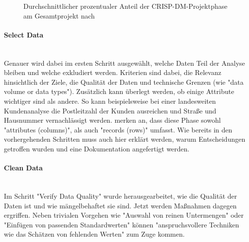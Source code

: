 \begin{figure}[H]
\caption{Durchschnittlicher prozentualer Anteil der CRISP-DM-Projektphase am Gesamtprojekt nach \citep[S.~15; eigene Darstellung]{shearer_crisp-dm_2000}}
\label{fig:CRISP_DM_percent}
\centering
\end{figure}

\paragraph{Select Data}\mbox{} \\
Genauer wird dabei im ersten Schritt ausgewählt, welche Daten Teil der Analyse bleiben und welche exkludiert werden. Kriterien sind dabei, die Relevanz hinsichtlich der Ziele, die Qualität der Daten und technische Grenzen\citep[S.~16]{shearer_crisp-dm_2000} (wie "data volume or data types"\citep[S.~21]{chapman_crisp-dm_2000}). Zusätzlich kann überlegt werden, ob einige Attribute wichtiger sind als andere. So kann beispielsweise bei einer landesweiten Kundenanalyse die Postleitzahl der Kunden ausreichen und Straße und Hausnummer vernachlässigt werden.\citep[S.~16]{shearer_crisp-dm_2000} \citep[S.21]{chapman_crisp-dm_2000} merken an, dass diese Phase sowohl "attributes (columns)", als auch "records (rows)" umfasst. Wie bereits in den vorhergehenden Schritten muss auch hier erklärt werden, warum Entscheidungen getroffen wurden und eine Dokumentation angefertigt werden.\citep[S.~16]{shearer_crisp-dm_2000}

\paragraph{Clean Data}\mbox{} \\
Im Schritt "Verify Data Quality" wurde herausgearbeitet, wie die Qualität der Daten ist  und wie mängelbehaftet sie sind. Jetzt werden Maßnahmen dagegen ergriffen. Neben trivialen Vorgehen wie "Auswahl von reinen Untermengen" oder "Einfügen von passenden Standardwerten" können "anspruchsvollere Techniken wie das Schätzen von fehlenden Werten"\citep[S.21; eigene Übersetzung]{chapman_crisp-dm_2000} zum Zuge kommen.

